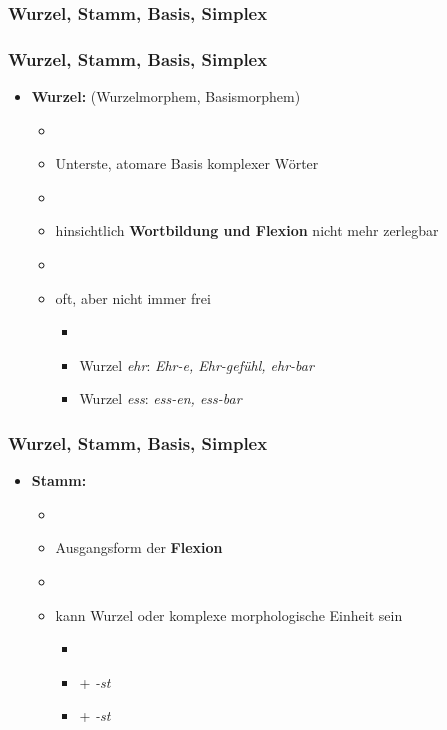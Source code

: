 \subsubsection{Wurzel, Stamm, Basis, Simplex}


\begin{frame}
\frametitle{Wurzel, Stamm, Basis, Simplex}

\begin{itemize}
	\item \textbf{Wurzel:} (Wurzelmorphem, Basismorphem)
	
	\begin{itemize}
		\item[]
		\item Unterste, atomare Basis komplexer Wörter
		\item[]
		\item hinsichtlich \textbf{Wortbildung und Flexion} nicht mehr zerlegbar
		\item[]
		\item oft, aber nicht immer frei
		
		\begin{itemize}
			\item[]			
			\item Wurzel \emph{ehr}: \emph{Ehr-e, Ehr-gefühl, ehr-bar}
			\item Wurzel \emph{ess}: \emph{ess-en, ess-bar}
		\end{itemize}
	\end{itemize}
\end{itemize}


\end{frame}



\begin{frame}
\frametitle{Wurzel, Stamm, Basis, Simplex}

\begin{itemize}
	\item \textbf{Stamm:}
	
	\begin{itemize}
		\item[]
		\item Ausgangsform der \textbf{Flexion}
		\item[]
		\item kann Wurzel oder komplexe morphologische Einheit sein
		
		\begin{itemize}
			\item[]
			\item {} + \emph{-st}
			\item {} + \emph{-st}
		\end{itemize}
	\end{itemize}
\end{itemize}

\end{frame}



